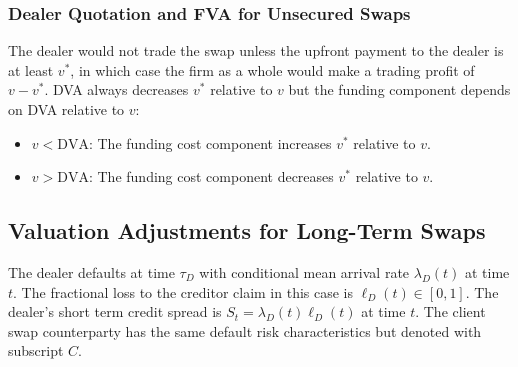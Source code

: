 \documentclass[10pt,a4paper]{article}
\begin{document}
            \subsubsection{Dealer Quotation and FVA for Unsecured Swaps}
                The dealer would not trade the swap unless the upfront payment to the dealer is at least $v^{\ast}$, in which case the firm as a whole would make a trading profit of $v-v^{\ast}$. DVA always decreases $v^{\ast}$ relative to $v$ but the funding component depends on DVA relative to $v$:
                    \begin{itemize}
                        \item $v < \text{DVA}$: The funding cost component increases $v^{\ast}$ relative to $v$. 
                        \item $v > \text{DVA}$: The funding cost component decreases $v^{\ast}$ relative to $v$.
                    \end{itemize}

        \subsection{Valuation Adjustments for Long-Term Swaps}
            The dealer defaults at time $\tau_{D}$ with conditional mean arrival rate $\lambda_{D}(t)$ at time $t$. The fractional loss to the creditor claim in this case is $\ell_{D}(t) \in [0, 1]$. The dealer's short term credit spread is $S_{t} = \lambda_{D}(t)\ell_{D}(t)$ at time $t$. The client swap counterparty has the same default risk characteristics but denoted with subscript $C$.
\end{document}
